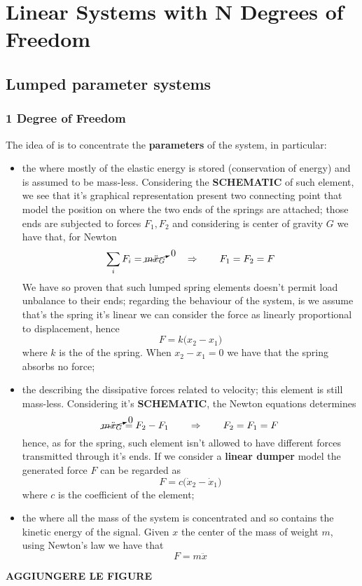 \chapter{Linear Systems with N Degrees of Freedom}
\section{Lumped parameter systems}
\subsection{1 Degree of Freedom}
	The idea of  is to concentrate the \textbf{parameters} of the system, in particular:
	\begin{itemize}
		\item the  where mostly of the elastic energy is stored (conservation of energy) and is assumed to be mass-less. Considering the \textbf{SCHEMATIC} of such element, we see that it's graphical representation present two connecting point that model the position on where the two ends of the springs are attached; those ends are subjected to forces $F_1,F_2$ and considering is center of gravity $G$ we have that, for Newton
		\[ \sum_i F_i = \cancelto 0{m \ddot x_G} \qquad \Rightarrow \qquad F_1 = F_2 = F\]
		We have so proven that such lumped spring elements doesn't permit load unbalance to their ends; regarding the behaviour of the system, is we assume that's the spring it's linear we can consider the force as linearly proportional to displacement, hence
		\begin{equation}
			F = k \big(x_2-x_1\big)
		\end{equation}
		where $k$ is the  of the spring. When $x_2 -x_1 = 0$ we have that the spring absorbs no force;
		
		\item the  describing the dissipative forces related to velocity; this element is still mass-less. Considering it's \textbf{SCHEMATIC}, the Newton equations determines
		\[ \cancelto0{m\ddot x_G} = F_2 - F_1 \qquad \Rightarrow \qquad F_2 = F_1 = F \]
		hence, as for the spring, such element isn't allowed to have different forces transmitted through it's ends. If we consider a \textbf{linear dumper} model the generated force $F$ can be regarded as
		\begin{equation}
			F = c \big(\dot x_2 - \dot x_1\big)
		\end{equation}
		where $c$ is the  coefficient of the element;
		
		\item the  where all the mass of the system is concentrated and so contains the kinetic energy of the signal. Given $x$ the center of the mass of weight $m$, using Newton's law we have that
		\begin{equation}
			F = m \ddot x
		\end{equation}		
	\end{itemize}
	\textbf{AGGIUNGERE LE FIGURE}
	

